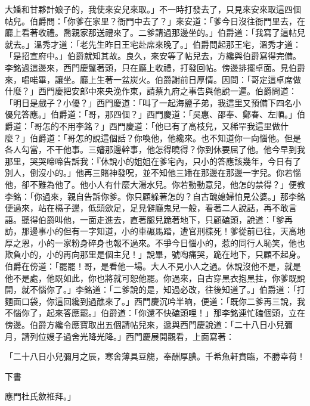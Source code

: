 \begin{showcontents}{}
大嬏和甘夥計娘子的，我使來安兒來取。」不一時打發去了，只見來安來取這四個帖兒。伯爵問：「你爹在家里？衙門中去了？」來安道：「爹今日沒往衙門里去，在廳上看著收禮。喬親家那送禮來了。二爹請過那邊坐的。」伯爵道：「我寫了這帖兒就去。」溫秀才道：「老先生昨日王宅赴席來晚了。」伯爵問起那王宅，溫秀才道：「是招宣府中。」伯爵就知其故。良久，來安等了帖兒去，方纔與伯爵寫得完備。李銘過這邊來，西門慶鬔著頭，只在廳上收禮，打發回帖。傍邊排擺卓面。見伯爵來，唱喏畢，讓坐。廳上生著一盆炭火。伯爵謝前日厚情。因問：「哥定這卓席做什麼？」西門慶把安郎中來央浼作東，請蔡九府之事告與他說一遍。伯爵問道：「明日是戲子？小優？」西門慶道：「叫了一起海鹽子弟，我這里又預備下四名小優兒答應。」伯爵道：「哥，那四個？」西門慶道：「吳惠、邵奉、鄭春、左順。」伯爵道：「哥怎的不用李銘？」西門慶道：「他已有了高枝兒，又稀罕我這里做什麼？」伯爵道：「哥怎的說這個話？你喚他，他纔來。也不知道你一向惱他。但是各人勾當，不干他事。三嬸那邊幹事，他怎得曉得？你到休要屈了他。他今早到我那里，哭哭啼啼告訴我：『休說小的姐姐在爹宅內，只小的答應該幾年，今日有了別人，倒沒小的。」他再三賭神發呪，並不知他三嬏在那邊在那邊一字兒。你若惱他，卻不難為他了。他小人有什麼大湯水兒。你若動動意兒，他怎的禁得？」便教李銘：「你過來，親自告訴你爹。你只顧躲著怎的？自古醜媳婦怕見公婆。」那李銘便過來，站在槅子邊，低頭歛足，足見僻廳鬼兒一般，看著二人說話，再不敢言語。聽得伯爵叫他，一面走進去，直著腿兒跪著地下，只顧磕頭，說道：「爹再訪，那邊事小的但有一字知道，小的車碾馬踏，遭官刑楪死！爹從前已往，天高地厚之恩，小的一家粉身碎身也報不過來。不爭今日惱小的，惹的同行人恥笑，他也欺負小的，小的再向那里是個主兒！」說畢，號啕痛哭，跪在地下，只顧不起身。伯爵在傍道：「罷罷！哥，是看他一場。大人不見小人之過。休說沒他不是，就是他不是處，他既如此，你也將就可恕他罷。你過來，自古穿黑衣抱黑拄，你爹既說開，就不惱你了。」李銘道：「二爹說的是，知過必改，往後知道了。」伯爵道：「打麵面口袋，你這回纔到過醮來了。」西門慶沉吟半晌，便道：「既你二爹再三說，我不惱你了，起來答應罷。」伯爵道：「你還不快磕頭哩！」那李銘連忙磕個頭，立在傍邊。伯爵方纔令應寶取出五個請帖兒來，遞與西門慶說道：「二十八日小兒彌月，請列位嫂子過舍光降光降。」西門慶展開觀看，上面寫著：

「二十八日小兒彌月之辰，寒舍薄具豆觴，奉酬厚腆。千希魚軒賁臨，不勝幸荷！

下書

應門杜氏歛袵拜。」


\end{showcontents}

